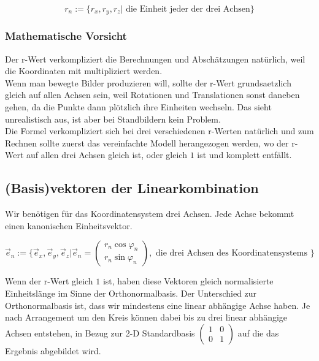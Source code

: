\documentclass[a4paper]{article}
\begin{document}
\begin{displaymath}
	r_n := \{ r_x , r_y , r_z | \mbox{ die Einheit jeder der drei Achsen}\}
\end{displaymath}



\subsubsection{Mathematische Vorsicht}

Der r-Wert verkompliziert die Berechnungen und Absch\"atzungen nat\"urlich, weil die Koordinaten mit multipliziert werden. \\

Wenn man bewegte Bilder produzieren will, sollte der r-Wert grundsaetzlich gleich auf allen Achsen sein, weil Rotationen und Translationen sonst daneben gehen, da die Punkte dann pl\"otzlich ihre Einheiten wechseln. Das sieht unrealistisch aus, ist aber
bei Standbildern kein Problem.\\

Die Formel verkompliziert sich bei drei verschiedenen r-Werten nat\"urlich und zum Rechnen sollte zuerst das vereinfachte Modell
herangezogen werden, wo der r-Wert auf allen drei Achsen gleich ist, oder gleich $1$ ist und komplett entf\"allt.\\

\subsection{(Basis)vektoren der Linearkombination}

Wir ben\"otigen f\"ur das Koordinatensystem drei Achsen. Jede Achse bekommt einen kanonischen Einheitsvektor. 

\begin{displaymath}
\vec{e}_n := \{ \vec{e}_x, \vec{e}_y, \vec{e}_z | \vec{e}_n = \begin{pmatrix}r_n \cos \varphi_n\\r_n \sin \varphi_n\end{pmatrix}, \mbox{ die drei Achsen des Koordinatensystems }\}
\end{displaymath}

Wenn der r-Wert gleich $1$ ist, haben diese Vektoren gleich normalisierte Einheitsl\"ange im Sinne der Orthonormalbasis. Der Unterschied zur Orthonormalbasis ist, dass wir mindestens eine linear abh\"angige Achse haben. Je nach Arrangement um den Kreis k\"onnen dabei bis zu drei linear abh\"angige Achsen entstehen, in Bezug zur 2-D Standardbasis $\begin{pmatrix}1&0\\0&1\end{pmatrix}$ auf die das Ergebnis abgebildet wird.\\
\end{document}
